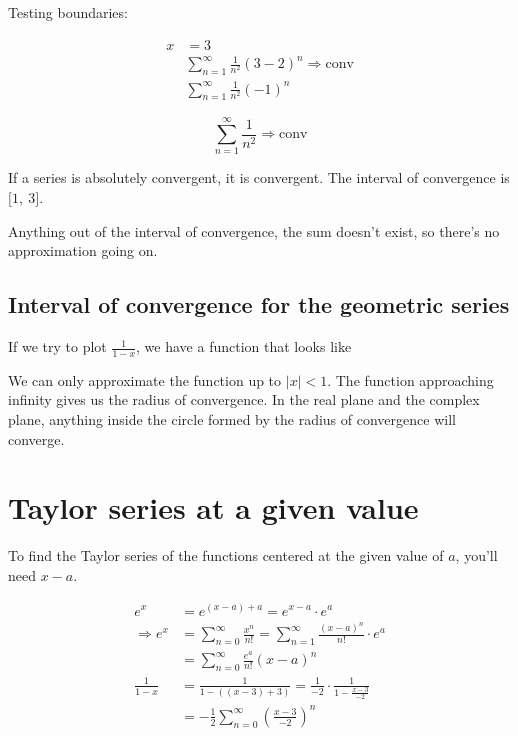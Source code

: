 \documentclass[12pt]{article}
\theoremstyle{plain}
\theoremstyle{remark}
\theoremstyle{definition}
\begin{document}
Testing boundaries:

\begin{align*}
x &= 3 \\
&\sum_{n = 1}^{\infty}{\frac{1}{n^{2}}(3 - 2)^{n}} \Rightarrow \text{conv} \\
&\sum_{n = 1}^{\infty}{\frac{1}{n^{2}}( - 1)^{n}}
\end{align*}


\[\sum_{n = 1}^{\infty}\frac{1}{n^{2}} \Rightarrow \text{conv}\]

If a series is absolutely convergent, it is convergent. The interval of
convergence is \(\lbrack 1,\ 3\rbrack\).

Anything out of the interval of convergence, the sum doesn't exist, so
there's no approximation going on.


\subsection{Interval of convergence for the geometric
series}

If we try to plot \(\frac{1}{1 - x}\), we have a function that looks
like


We can only approximate the function up to \(|x| < 1\). The function
approaching infinity gives us the radius of convergence. In the real
plane and the complex plane, anything inside the circle formed by the
radius of convergence will converge.


\section{Taylor series at a given
value}

To find the Taylor series of the functions centered at the given value
of \(a\), you'll need \(x - a\).

\begin{align*}
e^{x} &= e^{(x - a) + a} = e^{x - a} \cdot e^{a} \\
\Rightarrow e^{x} &= \sum_{n = 0}^{\infty}\frac{x^{n}}{n!} = \sum_{n = 1}^{\infty}{\frac{(x - a)^{n}}{n!} \cdot e^{a}} \\
&= \sum_{n = 0}^{\infty}{\frac{e^{a}}{n!}(x - a)^{n}}
 \\
\frac{1}{1 - x} &= \frac{1}{1 - \left( (x - 3) + 3 \right)} = \frac{1}{- 2} \cdot \frac{1}{1 - \frac{x - 3}{- 2}} \\
&= - \frac{1}{2}\sum_{n = 0}^{\infty}\left( \frac{x - 3}{- 2} \right)^{n}
\end{align*}
\end{document}
